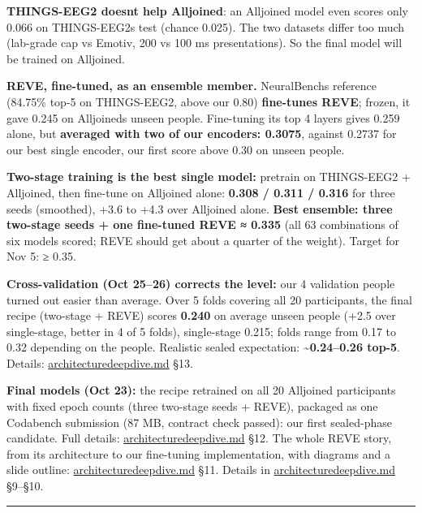 \documentclass[
  11pt,
]{article}
\renewcommand{\_}{\oldunderscore\allowbreak}
\begin{document}
\textbf{THINGS-EEG2
doesn\textquotesingle t help Alljoined}:
an Alljoined model even scores only
0.066 on THINGS-EEG2\textquotesingle s
test (chance 0.025). The two datasets
differ too much (lab-grade cap vs
Emotiv, 200 vs 100 ms presentations). So
the final model will be trained on
Alljoined.

\textbf{REVE, fine-tuned, as an ensemble
member.} NeuralBench\textquotesingle s
reference (84.75\% top-5 on THINGS-EEG2,
above our 0.80) \textbf{fine-tunes
REVE}; frozen, it gave 0.245 on
Alljoined\textquotesingle s unseen
people. Fine-tuning its top 4 layers
gives 0.259 alone, but \textbf{averaged
with two of our encoders: 0.3075},
against 0.2737 for our best single
encoder, our first score above 0.30 on
unseen people.

\textbf{Two-stage training is the best
single model:} pretrain on THINGS-EEG2 +
Alljoined, then fine-tune on Alljoined
alone: \textbf{0.308 / 0.311 / 0.316}
for three seeds (smoothed), +3.6 to +4.3
over Alljoined alone. \textbf{Best
ensemble: three two-stage seeds + one
fine-tuned REVE ≈ 0.335} (all 63
combinations of six models scored; REVE
should get about a quarter of the
weight). Target for Nov 5: ≥ 0.35.

\textbf{Cross-validation (Oct 25--26)
corrects the level:} our 4 validation
people turned out easier than average.
Over 5 folds covering all 20
participants, the final recipe
(two-stage + REVE) scores \textbf{0.240}
on average unseen people (+2.5 over
single-stage, better in 4 of 5 folds),
single-stage 0.215; folds range from
0.17 to 0.32 depending on the people.
Realistic sealed expectation:
\textbf{\textasciitilde0.24--0.26
top-5}. Details:
\href{architecture_deep_dive.pdf}{architecture\_deep\_dive.md}
§13.

\textbf{Final models (Oct 23):} the
recipe retrained on all 20 Alljoined
participants with fixed epoch counts
(three two-stage seeds + REVE), packaged
as one Codabench submission (87 MB,
contract check passed): our first
sealed-phase candidate. Full details:
\href{architecture_deep_dive.pdf}{architecture\_deep\_dive.md}
§12. The whole REVE story, from its
architecture to our fine-tuning
implementation, with diagrams and a
slide outline:
\href{architecture_deep_dive.pdf}{architecture\_deep\_dive.md}
§11. Details in
\href{architecture_deep_dive.pdf}{architecture\_deep\_dive.md}
§9--§10.

\begin{center}\rule{0.5\linewidth}{0.5pt}\end{center}
\end{document}
